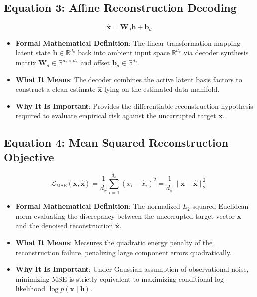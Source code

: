 \documentclass[11pt,a4paper]{article}
\theoremstyle{definition}
\begin{document}
\subsection{\textbf{Equation 3: Affine Reconstruction Decoding}}
{\boldmath
\begin{equation}
\hat{\mathbf{x}} = \mathbf{W}_d \mathbf{h} + \mathbf{b}_d
\end{equation}
}
\begin{itemize}
    \item \textbf{Formal Mathematical Definition}:
    The linear transformation mapping latent state $\mathbf{h} \in \mathbb{R}^{d_h}$ back into ambient input space $\mathbb{R}^{d_x}$ via decoder synthesis matrix $\mathbf{W}_d \in \mathbb{R}^{d_x \times d_h}$ and offset $\mathbf{b}_d \in \mathbb{R}^{d_x}$.
    \item \textbf{What It Means}:
    The decoder combines the active latent basis factors to construct a clean estimate $\hat{\mathbf{x}}$ lying on the estimated data manifold.
    \item \textbf{Why It Is Important}:
    Provides the differentiable reconstruction hypothesis required to evaluate empirical risk against the uncorrupted target $\mathbf{x}$.
\end{itemize}

\subsection{\textbf{Equation 4: Mean Squared Reconstruction Objective}}
{\boldmath
\begin{equation}
\mathcal{L}_{\text{MSE}}(\mathbf{x}, \hat{\mathbf{x}}) = \frac{1}{d_x} \sum_{i=1}^{d_x} (x_i - \hat{x}_i)^2 = \frac{1}{d_x} \|\mathbf{x} - \hat{\mathbf{x}}\|_2^2
\end{equation}
}
\begin{itemize}
    \item \textbf{Formal Mathematical Definition}:
    The normalized $L_2$ squared Euclidean norm evaluating the discrepancy between the uncorrupted target vector $\mathbf{x}$ and the denoised reconstruction $\hat{\mathbf{x}}$.
    \item \textbf{What It Means}:
    Measures the quadratic energy penalty of the reconstruction failure, penalizing large component errors quadratically.
    \item \textbf{Why It Is Important}:
    Under Gaussian assumption of observational noise, minimizing MSE is strictly equivalent to maximizing conditional log-likelihood $\log p(\mathbf{x} \mid \mathbf{h})$.
\end{itemize}
\end{document}
